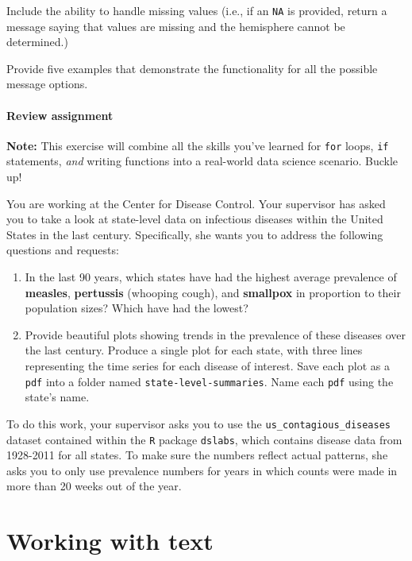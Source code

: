 \documentclass[
]{book}
\begin{document}
Include the ability to handle missing values (i.e., if an \texttt{NA} is provided, return a message saying that values are missing and the hemisphere cannot be determined.)

Provide five examples that demonstrate the functionality for all the possible message options.

\hypertarget{review-assignment-9}{%
\subsubsection*{Review assignment}\label{review-assignment-9}}

\textbf{Note:} This exercise will combine all the skills you've learned for \texttt{for} loops, \texttt{if} statements, \emph{and} writing functions into a real-world data science scenario. Buckle up!

You are working at the Center for Disease Control. Your supervisor has asked you to take a look at state-level data on infectious diseases within the United States in the last century. Specifically, she wants you to address the following questions and requests:

\begin{enumerate}
\def\labelenumi{\arabic{enumi}.}
\item
  In the last 90 years, which states have had the highest average prevalence of \textbf{measles}, \textbf{pertussis} (whooping cough), and \textbf{smallpox} in proportion to their population sizes? Which have had the lowest?
\item
  Provide beautiful plots showing trends in the prevalence of these diseases over the last century. Produce a single plot for each state, with three lines representing the time series for each disease of interest. Save each plot as a \texttt{pdf} into a folder named \texttt{state-level-summaries}. Name each \texttt{pdf} using the state's name.
\end{enumerate}

To do this work, your supervisor asks you to use the \texttt{us\_contagious\_diseases} dataset contained within the \texttt{R} package \texttt{dslabs}, which contains disease data from 1928-2011 for all states. To make sure the numbers reflect actual patterns, she asks you to only use prevalence numbers for years in which counts were made in more than 20 weeks out of the year.

\hypertarget{text}{%
\chapter{Working with text}\label{text}}
\end{document}
